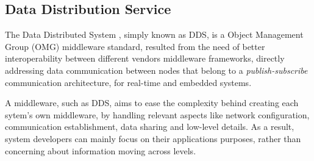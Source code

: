 

\subsection{Data Distribution Service}

The Data Distributed System \cite{3}, simply known as DDS, is a Object Management Group (OMG) middleware standard, resulted from the need of better interoperability between different vendors middleware frameworks, directly addressing data communication between nodes that belong to a \textit{publish-subscribe} communication architecture, for real-time and embedded systems. %
            
A middleware, such as DDS, aims to ease the complexity behind creating each sytem's own middleware, by handling relevant aspects like network configuration, communication establishment, data sharing and low-level details. As a result, system developers can mainly focus on their applications purposes, rather than concerning about information moving across levels. \cite{dds-what-is} 

